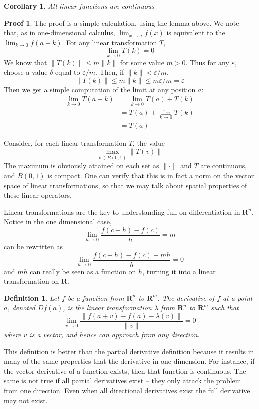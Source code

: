 \documentclass[12pt]{amsbook}
\theoremstyle{plain}
\newtheorem{definition}{Definition}
\newtheorem{corollary}[theorem]{Corollary}
\theoremstyle{definition}
\newtheorem*{prf}{Proof}
\begin{document}
\begin{corollary}
  All linear functions are continuous
\end{corollary}
\begin{prf}
  The proof is a simple calculation, using the lemma above. We note that, as in one-dimensional calculus, $\lim_{x \to a} f(x)$ is equivalent to the $\lim_{k \to 0} f(a + k)$. For any linear transformation $T$,
  \[ \lim_{k \to 0} T(k) = 0 \]
  We know that $\| T(k) \| \leq m \| k \|$ for some value $m > 0$. Thus for any $\varepsilon$, choose a value $\delta$ equal to $\varepsilon/m$. Then, if $\| k \| < \varepsilon/m$,
  \[ \| T(k) \| \leq m \| k \| \leq m \varepsilon/m = \varepsilon \]
  Then we get a simple computation of the limit at any position $a$:
  \begin{align*}
    \lim_{k \to 0} T(a + k) &= \lim_{k \to 0} T(a) + T(k)\\
                            &= T(a) + \lim_{k \to 0} T(k)\\
                            &= T(a)
  \end{align*}
\end{prf}

Consider, for each linear transformation $T$, the value
%
\[ \max_{v \in \overline{B}(0,1)} \|T(v)\| \]
%
The maximum is obviously attained on each set as $\|\cdot\|$ and $T$ are continuous, and $\overline{B}(0,1)$ is compact. One can verify that this is in fact a norm on the vector space of linear transformations, so that we may talk about spatial properties of these linear operators.

Linear transformations are the key to understanding full on differentiation in $\mathbf{R}^n$. Notice in the one dimensional case,
%
\[ \lim_{h \to 0} \frac{f(c + h) - f(c)}{h} = m \]
%
can be rewritten as
%
\[ \lim_{h \to 0} \frac{f(c + h) - f(c) - mh}{h} = 0 \]
%
and $mh$ can really be seen as a function on $h$, turning it into a linear transformation on $\mathbf{R}$.

\begin{definition}
  Let $f$ be a function from $\mathbf{R}^n$ to $\mathbf{R}^m$. The derivative of $f$ at a point $a$, denoted $Df(a)$, is the linear transformation $\lambda$ from $\mathbf{R}^n$ to $\mathbf{R}^m$ such that
  \[ \lim_{v \to 0} \frac{\|f(a + v) - f(a) - \lambda(v)\|}{\|v\|} = 0 \]
  where $v$ is a vector, and hence can approach from any direction.
\end{definition}

This definition is better than the partial derivative definition because it results in many of the same properties that the derivative in one dimension. For instance, if the vector derivative of a function exists, then that function is continuous. The same is not true if all partial derivatives exist -- they only attack the problem from one direction. Even when all directional derivatives exist the full derivative may not exist.
\end{document}
